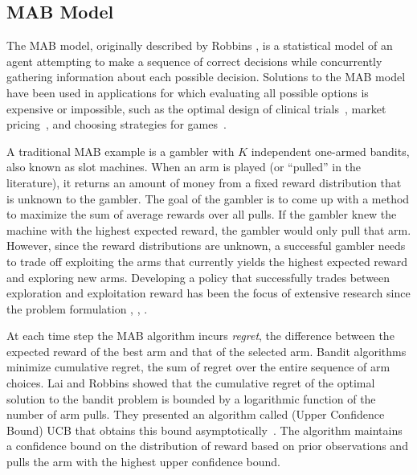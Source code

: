 \documentclass[10pt, conference]{ieeeconf}      %
\begin{document}
\subsection{MAB Model}
The MAB model, originally described by Robbins \cite{robbins1985some}, is a statistical model of an agent attempting to make a sequence of correct decisions while concurrently gathering information about each possible decision. Solutions to the MAB model have been used in applications for which evaluating all possible options is expensive or impossible, such as the optimal design of clinical trials~\cite{simon1989optimal}, market pricing~\cite{rothschild1974two}, and choosing strategies for games~\cite{st2012online}. 

A traditional MAB example is a gambler with $K$ independent one-armed bandits, also known as slot machines.
When an arm is played (or ``pulled'' in the literature), it returns an amount of money from a fixed reward distribution that is unknown to the gambler.
The goal of the gambler is to come up with a method to maximize the sum of average rewards over all pulls.
If the gambler knew the machine with the highest expected reward, the gambler would only pull that arm.
However, since the reward distributions are unknown, a successful gambler needs to trade off exploiting the arms that currently yields the highest expected reward and exploring new arms.
Developing a policy that successfully trades between exploration and exploitation reward has been the focus of extensive research since the problem formulation \cite{bubeck2009pure}, \cite{robbins1985some}, \cite{bergemann2006bandit}.

At each time step the MAB algorithm incurs \textit{regret}, the difference between the expected reward of the best arm and that of the selected arm. Bandit algorithms minimize cumulative regret, the sum of regret over the entire sequence of arm choices.
Lai and Robbins\cite{lai1985asymptotically} showed that the cumulative regret of the optimal solution to the bandit problem is bounded by a logarithmic function of the number of arm pulls.
They presented an algorithm called (Upper Confidence Bound) UCB that obtains this bound asymptotically~\cite{lai1985asymptotically}.
The algorithm maintains a confidence bound on the distribution of reward based on prior observations and pulls the arm with the highest upper confidence bound.
\end{document}
